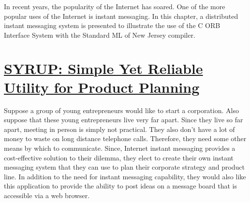 
In recent years, the popularity of the Internet has soared. 
One of the more popular uses of the Internet is instant messaging. 
In this chapter, a distributed instant messaging system 
is presented to illustrate the use of the C ORB Interface 
System with the Standard ML of New Jersey compiler. 

\section*{\underline{SYRUP: Simple Yet Reliable Utility for Product Planning}}

Suppose a group of young entrepreneurs would like to start a 
corporation.  Also suppose that these young entrepreneurs live very 
far apart.  Since they live so far apart, meeting in person is simply 
not practical.  They also don't have a lot of money to waste on long 
distance telephone calls.  Therefore, they need some other means by which 
to communicate.  Since, Internet instant messaging provides a cost-effective 
solution to their dilemma, they elect to create their own instant messaging 
system that they can use to plan their corporate strategy and product line.   
In addition to the need for instant messaging capability, they would also 
like this application to provide the ability to post ideas on a message 
board that is accessible via a web browser.   

